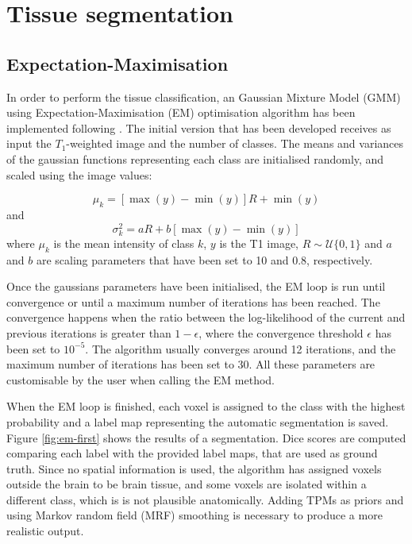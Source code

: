 \section{Tissue segmentation}


\subsection{Expectation-Maximisation}
In order to perform the tissue classification, an Gaussian Mixture Model (GMM) using Expectation-Maximisation (EM) optimisation algorithm has been implemented following \cite{leemput_automated_1999-1}. The initial version that has been developed receives as input the $T_1$-weighted image and the number of classes. The means and variances of the gaussian functions representing each class are initialised randomly, and scaled using the image values:

\begin{equation}
  \mu_k = [\max(y) - \min(y)] R + \min(y)
\end{equation}
and
\begin{equation}
  \sigma^2_k = a R + b [\max(y) - \min(y)]
\end{equation}
where $\mu_k$ is the mean intensity of class $k$, $y$ is the T1 image, $R \sim \mathcal{U}\{0, 1\}$ and $a$ and $b$ are scaling parameters that have been set to 10 and 0.8, respectively.

Once the gaussians parameters have been initialised, the EM loop is run until convergence or until a maximum number of iterations has been reached. The convergence happens when the ratio between the log-likelihood of the current and previous iterations is greater than $1 - \epsilon$, where the convergence threshold $\epsilon$ has been set to $10^{-5}$. The algorithm usually converges around 12 iterations, and the maximum number of iterations has been set to 30. All these parameters are customisable by the user when calling the EM method.

When the EM loop is finished, each voxel is assigned to the class with the highest probability and a label map representing the automatic segmentation is saved. Figure \ref{fig:em-first} shows the results of a segmentation. Dice scores are computed comparing each label with the provided label maps, that are used as ground truth. Since no spatial information is used, the algorithm has assigned voxels outside the brain to be brain tissue, and some voxels are isolated within a different class, which is is not plausible anatomically. Adding TPMs as priors and using Markov random field (MRF) smoothing is necessary to produce a more realistic output.

